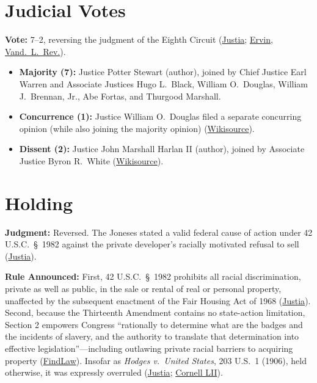\documentclass[12pt]{article}
\begin{document}
\section{Judicial Votes}

\textbf{Vote:} 7--2, reversing the judgment of the Eighth Circuit (\href{https://supreme.justia.com/cases/federal/us/392/409/}{Justia}; \href{https://scholarship.law.vanderbilt.edu/cgi/viewcontent.cgi?article=3460&context=vlr}{Ervin, Vand.\ L.\ Rev.}).

\begin{itemize}
\item \textbf{Majority (7):} Justice Potter Stewart (author), joined by Chief Justice Earl Warren and Associate Justices Hugo L.\ Black, William O.\ Douglas, William J.\ Brennan, Jr., Abe Fortas, and Thurgood Marshall.
\item \textbf{Concurrence (1):} Justice William O.\ Douglas filed a separate concurring opinion (while also joining the majority opinion) (\href{https://en.wikisource.org/wiki/Jones_v._Alfred_H._Mayer_Co./Concurrence_Douglas}{Wikisource}).
\item \textbf{Dissent (2):} Justice John Marshall Harlan II (author), joined by Associate Justice Byron R.\ White (\href{https://en.wikisource.org/wiki/Jones_v._Mayer/Dissent_Harlan}{Wikisource}).
\end{itemize}

\section{Holding}

\textbf{Judgment:} Reversed. The Joneses stated a valid federal cause of action under 42 U.S.C.\ \S~1982 against the private developer's racially motivated refusal to sell (\href{https://supreme.justia.com/cases/federal/us/392/409/}{Justia}).

\textbf{Rule Announced:} First, 42 U.S.C.\ \S~1982 prohibits all racial discrimination, private as well as public, in the sale or rental of real or personal property, unaffected by the subsequent enactment of the Fair Housing Act of 1968 (\href{https://supreme.justia.com/cases/federal/us/392/409/}{Justia}). Second, because the Thirteenth Amendment contains no state-action limitation, Section 2 empowers Congress ``rationally to determine what are the badges and the incidents of slavery, and the authority to translate that determination into effective legislation''---including outlawing private racial barriers to acquiring property (\href{https://constitution.findlaw.com/amendment13.html}{FindLaw}). Insofar as \textit{Hodges v.\ United States}, 203 U.S.\ 1 (1906), held otherwise, it was expressly overruled (\href{https://supreme.justia.com/cases/federal/us/392/409/}{Justia}; \href{https://www.law.cornell.edu/constitution-conan/amendment-13/scope-of-enforcement-clause-of-thirteenth-amendment}{Cornell LII}).
\end{document}
